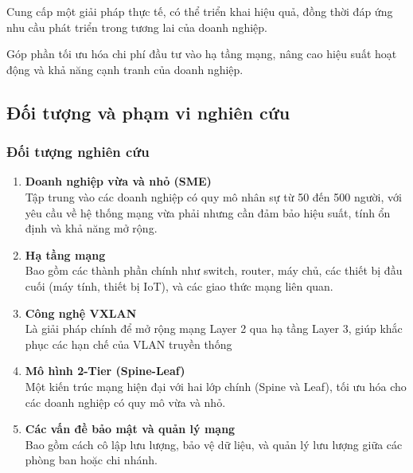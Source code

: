 \documentclass[13pt]{article}
\begin{document}
    Cung cấp một giải pháp thực tế, có thể triển khai hiệu quả, đồng thời đáp ứng nhu cầu phát triển trong tương lai của doanh nghiệp.
    
    Góp phần tối ưu hóa chi phí đầu tư vào hạ tầng mạng, nâng cao hiệu suất hoạt động và khả năng cạnh tranh của doanh nghiệp.

    \subsection{Đối tượng và phạm vi nghiên cứu}
    \subsubsection{Đối tượng nghiên cứu}
    \begin{enumerate}
        \item \textbf {Doanh nghiệp vừa và nhỏ (SME)}\\
        Tập trung vào các doanh nghiệp có quy mô nhân sự từ 50 đến 500 người, với yêu cầu về hệ thống mạng vừa phải nhưng cần đảm bảo hiệu suất, tính ổn định và khả năng mở rộng.

        \item \textbf{Hạ tầng mạng}\\
        Bao gồm các thành phần chính như switch, router, máy chủ, các thiết bị đầu cuối (máy tính, thiết bị IoT), và các giao thức mạng liên quan.

        \item \textbf{Công nghệ VXLAN}\\
        Là giải pháp chính để mở rộng mạng Layer 2 qua hạ tầng Layer 3, giúp khắc phục các hạn chế của VLAN truyền thống

        \item \textbf{Mô hình 2-Tier (Spine-Leaf)}\\
        Một kiến trúc mạng hiện đại với hai lớp chính (Spine và Leaf), tối ưu hóa cho các doanh nghiệp có quy mô vừa và nhỏ.

        \item \textbf{Các vấn đề bảo mật và quản lý mạng}\\
        Bao gồm cách cô lập lưu lượng, bảo vệ dữ liệu, và quản lý lưu lượng giữa các phòng ban hoặc chi nhánh.

    \end{enumerate}
    
\end{document}
